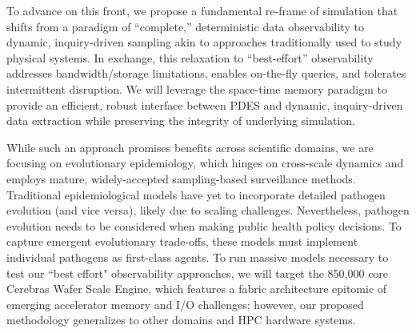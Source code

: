To advance on this front, we propose a fundamental re-frame of simulation that shifts from a paradigm of ``complete,'' deterministic data observability to dynamic, inquiry-driven sampling akin to approaches traditionally used to study physical systems.
In exchange, this relaxation to ``best-effort'' observability addresses bandwidth/storage limitations, enables on-the-fly queries, and tolerates intermittent disruption.
We will leverage the space-time memory paradigm to provide an efficient, robust interface between PDES and dynamic, inquiry-driven data extraction while preserving the integrity of underlying simulation.

While such an approach promises benefits across scientific domains, we are focusing on evolutionary epidemiology, which hinges on cross-scale dynamics and employs mature, widely-accepted sampling-based surveillance methods.
Traditional epidemiological models have yet to incorporate detailed pathogen evolution (and vice versa), likely due to %
scaling challenges.%
Nevertheless, pathogen evolution needs to be considered when making public health policy decisions.
To capture emergent evolutionary trade-offs, these models must implement individual pathogens as first-class agents.
To run massive models necessary to test our ``best effort" observability approaches, we will target the 850,000 core Cerebras Wafer Scale Engine, which features a fabric architecture epitomic of emerging accelerator memory and I/O challenges; however, our proposed methodology generalizes to other domains and HPC hardware systems.


